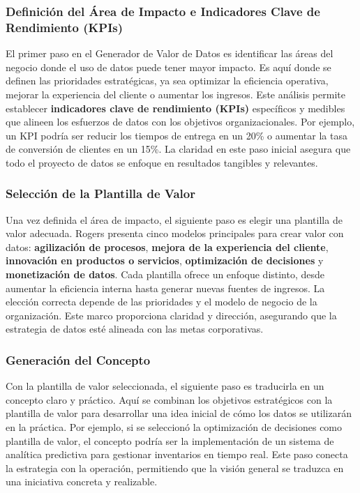 \subsubsection{Definición del Área de Impacto e Indicadores Clave de Rendimiento
	(KPIs)}

El primer paso en el Generador de Valor de Datos es identificar las áreas del negocio
donde el uso de datos puede tener mayor impacto. Es aquí donde se definen las
prioridades estratégicas, ya sea optimizar la eficiencia operativa, mejorar la
experiencia del cliente o aumentar los ingresos. Este análisis permite establecer
\textbf{indicadores clave de rendimiento (KPIs)} específicos y medibles que
alineen los esfuerzos de datos con los objetivos organizacionales. Por ejemplo,
un KPI podría ser reducir los tiempos de entrega en un 20\% o aumentar la tasa de
conversión de clientes en un 15\%. La claridad en este paso inicial asegura que todo
el proyecto de datos se enfoque en resultados tangibles y relevantes.

\subsubsection{Selección de la Plantilla de Valor}

Una vez definida el área de impacto, el siguiente paso es elegir una plantilla de
valor adecuada. Rogers presenta cinco modelos principales para crear valor con
datos: \textbf{agilización de procesos}, \textbf{mejora de la experiencia del
	cliente}, \textbf{innovación en productos o servicios}, \textbf{optimización de
	decisiones} y \textbf{monetización de datos}. Cada plantilla ofrece un enfoque
distinto, desde aumentar la eficiencia interna hasta generar nuevas fuentes de ingresos.
La elección correcta depende de las prioridades y el modelo de negocio de la
organización. Este marco proporciona claridad y dirección, asegurando que la
estrategia de datos esté alineada con las metas corporativas.

\subsubsection{Generación del Concepto}

Con la plantilla de valor seleccionada, el siguiente paso es traducirla en un
concepto claro y práctico. Aquí se combinan los objetivos estratégicos con la plantilla
de valor para desarrollar una idea inicial de cómo los datos se utilizarán en la
práctica. Por ejemplo, si se seleccionó la optimización de decisiones como plantilla
de valor, el concepto podría ser la implementación de un sistema de analítica
predictiva para gestionar inventarios en tiempo real. Este paso conecta la estrategia
con la operación, permitiendo que la visión general se traduzca en una
iniciativa concreta y realizable.

